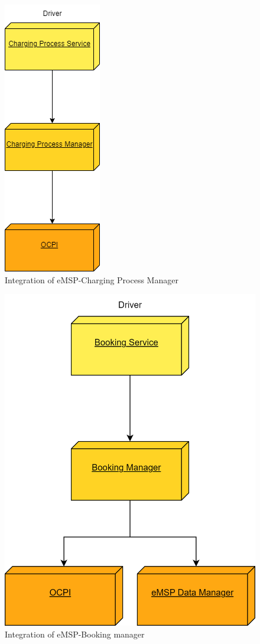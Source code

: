 \documentclass[table, 12pt]{article}
\begin{document}
\begin{figure}[H]
    \centering
    \includegraphics[scale=0.6]{assets/Integration Diagrams/eMSP-Charging Process Manager.png} 
    \caption{Integration of eMSP-Charging Process Manager}%
    \label{fig: eMSP-Charging Process Manager}%
\end{figure}

\begin{figure}[H]
    \centering
    \includegraphics[scale=0.6]{assets/Integration Diagrams/eMSP-Booking Manager.png} 
    \caption{Integration of eMSP-Booking manager}%
    \label{fig: eMSP-Booking manager}%
\end{figure}
\end{document}
